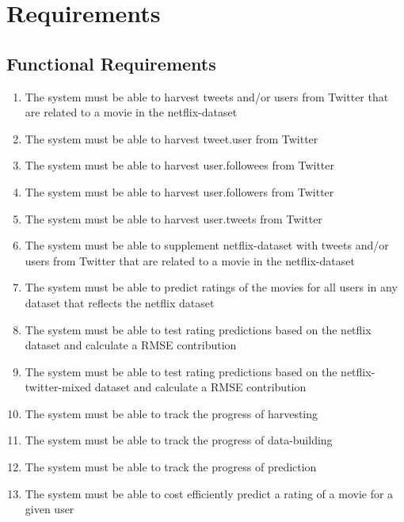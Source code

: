 
\appendix
\clearpage
{}
\setcounter{page}{1}



\chapter{Requirements}\label{app:req}
\section{Functional Requirements}
\begin{enumerate}[label=\bfseries FR \arabic*:]
  \item The system must be able to harvest tweets and/or users from Twitter that are related to a movie in the netflix-dataset
  \item The system must be able to harvest tweet.user from Twitter
  \item The system must be able to harvest user.followees from Twitter
  \item The system must be able to harvest user.followers from Twitter
  \item The system must be able to harvest user.tweets from Twitter
  \item The system must be able to supplement netflix-dataset with tweets and/or users from Twitter that are related to a movie in the netflix-dataset
  \item The system must be able to predict ratings of the movies for all users in any dataset that reflects the netflix dataset
  \item The system must be able to test rating predictions based on the netflix dataset and calculate a RMSE contribution
  \item The system must be able to test rating predictions based on the netflix-twitter-mixed dataset and calculate a RMSE contribution
  \item The system must be able to track the progress of harvesting
  \item The system must be able to track the progress of data-building
  \item The system must be able to track the progress of prediction
  \item The system must be able to cost efficiently predict a rating of a movie for a given user
\end{enumerate}





